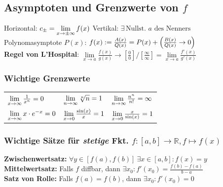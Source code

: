 \documentclass[german]{latex4ei/latex4ei_sheet}
\begin{document}
\begin{sectionbox}
	\subsection{Asymptoten und Grenzwerte von $f$}
	Horizontal: $c_\pm =\lim\limits_{x\rightarrow \pm \infty} f(x)$ \qquad Vertikal: $\exists\,\text{Nullst. } a \text{ des Nenners }$\\ %
	Polynomasymptote $P(x)$: $f(x):=\frac{A(x)}{Q(x)}=P(x)+ \Big(\frac{B(x)}{Q(x)}\rightarrow 0\Big)$\\
	\textbf{Regel von L'Hospital}: $\lim\limits_{x \rightarrow a} \frac{f(x)}{g(x)} \rightarrow \left[ \frac{0}{0} \right]\!/\!\left[ \frac{\infty}{\infty} \right] = \lim\limits_{x \rightarrow a} \frac{f'(x)}{g'(x)}$\\[0.5em]

		\subsubsection{Wichtige Grenzwerte}
		\begin{tabular*}{\columnwidth}{l@{\extracolsep\fill}ll}
			$\lim\limits_{x \rightarrow \infty} \frac{1}{x^n} = 0$ & $\lim\limits_{n \rightarrow \infty} \sqrt[n]{n} = 1$ & $\lim\limits_{n \rightarrow \infty} \frac{n^n}{n!} = \infty$\\
			$\lim\limits_{x \rightarrow \infty} x \cdot e^{-x} = 0$ & $\lim\limits_{x \rightarrow 0} \frac{\sin(x)}{x} = 1$ & $\lim\limits_{x \rightarrow 0} \frac{x}{\sin(x)} = 1$\\
		\end{tabular*}

		\subsubsection{Wichtige Sätze für \emph{stetige} Fkt. $f: [a,b] \rightarrow \mathbb R, f \mapsto f(x)$ }
		\textbf{Zwischenwertsatz:} $\forall y \in [f(a),f(b)]\ \exists x\in [a,b]:f(x)=y$\\
		\textbf{Mittelwertsatz:} Falls $f$ diffbar, dann $\exists x_0:f'(x_0)=\frac{f(b)-f(a)}{b-a}$\\
		\textbf{Satz von Rolle:} Falls $f(a)=f(b)$, dann $\exists x_0: f' (x_0) = 0$\\ 
\end{sectionbox}
\end{document}
